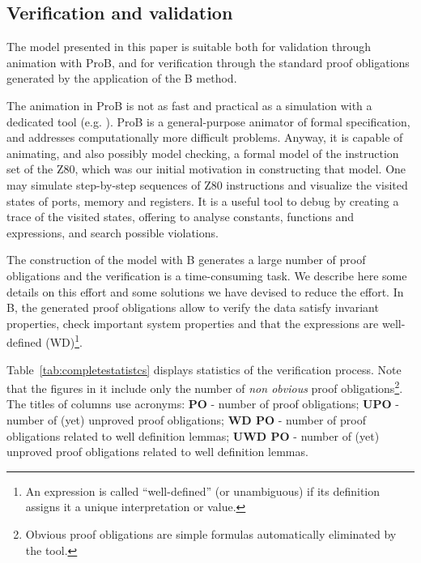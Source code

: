 \documentclass[a4paper]{llncs}
\begin{document}
\subsection{Verification and validation}%

The model presented in this paper is suitable both for validation
through animation with ProB, and for verification through the standard
proof obligations generated by the application of the B method. 

The animation in ProB is not as fast and practical as a simulation
with a dedicated tool (e.g. \cite{Simulator_z80}). ProB is a
general-purpose animator of formal specification, and addresses
computationally more difficult problems. Anyway, it is capable of
animating, and also possibly model checking, a formal model of the
instruction set of the Z80, which was our initial motivation in
constructing that model. One may simulate step-by-step sequences of
Z80 instructions and visualize the visited states of ports, memory and
registers. It is a useful tool to debug by creating a trace of the
visited states, offering to analyse constants, functions and
expressions, and search possible violations.


The construction of the model with B generates a large number of proof
obligations and the verification is a time-consuming task. We describe
here some details on this effort and some solutions we have devised to
reduce the effort.  In B, the generated proof obligations allow to
verify the data satisfy invariant properties, check important system
properties and that the expressions are well-defined (WD)\footnote{An
  expression is called ``well-defined'' (or unambiguous) if its
  definition assigns it a unique interpretation or value.}. 

Table~\ref{tab:completestatistcs} displays statistics of the
verification process. Note that the figures in it include only the
number of \emph{non obvious} proof obligations\footnote{Obvious proof
  obligations are simple formulas automatically eliminated by the
  tool.}. The titles of columns use acronyms: {\small \textbf{PO}} -
number of proof obligations; {\small \textbf{UPO}} - number of (yet)
unproved proof obligations; {\small \textbf{WD PO}} - number of proof
obligations related to well definition lemmas; {\small \textbf{UWD
    PO}} - number of (yet) unproved proof obligations related to well
definition lemmas.
 
\end{document}
